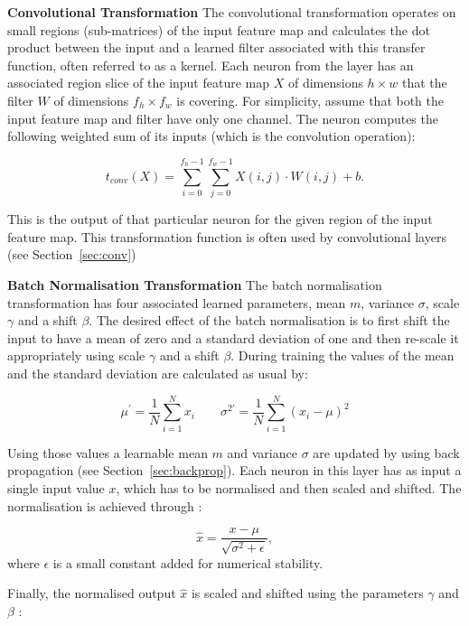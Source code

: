 \textbf{Convolutional Transformation}
\label{section:conv}
The convolutional transformation operates on small regions (sub-matrices) of the input feature map and calculates the dot product between the input and a learned filter associated with this transfer function, often referred to as a kernel. Each neuron from the layer has an associated region slice of the input feature map $X$ of dimensions $h \times w$ that the filter $W$ of dimensions \( f_h \times f_w \) is covering. For simplicity, assume that both the input feature map and filter have only one channel. The neuron computes the following weighted sum of its inputs (which is the convolution operation):

\begin{equation}
t_{conv}(X) = \sum_{i=0}^{f_h - 1} \sum_{j=0}^{f_w - 1} X(i, j) \cdot W(i, j) + b.
\label{eq:conv}
\end{equation}

This is the output of that particular neuron for the given region of the input feature map. This transformation function is often used by convolutional layers (see Section~\ref{sec:conv})

\textbf{Batch Normalisation Transformation}
The batch normalisation transformation has four associated learned parameters, mean $m$, variance $\sigma$, scale $\gamma$ and a shift $\beta$. The desired effect of the batch normalisation is to first shift the input to have a mean of zero and a standard deviation of one and then re-scale it appropriately using scale $\gamma$ and a shift $\beta$.
During training the values of the mean and the standard deviation are calculated as usual by:

\begin{equation}
\mu^\prime = \frac{1}{N} \sum_{i=1}^{N} x_i \qquad \sigma^{2\prime} = \frac{1}{N} \sum_{i=1}^{N} (x_i - \mu)^2
\end{equation}

Using those values a learnable mean $m$ and variance $\sigma$ are updated by using back propagation (see Section~\ref{sec:backprop}). Each neuron in this layer has as input a single input value $x$, which has to be normalised and then scaled and shifted. The normalisation is achieved through :

\begin{equation}
\hat{x} = \frac{x - \mu}{\sqrt{\sigma^2 + \epsilon}},
\end{equation}
where $\epsilon $ is a small constant added for numerical stability.

Finally, the normalised output $\hat{x}$ is scaled and shifted using the parameters  $\gamma$  and  $\beta$ :

